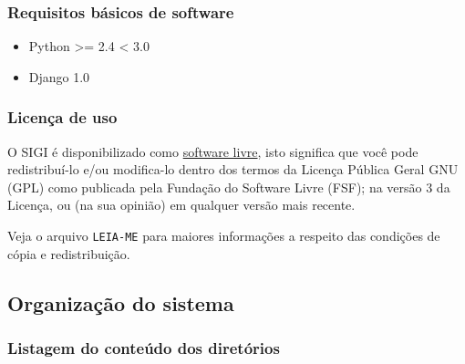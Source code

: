 
\hypertarget{requisitos-b-sicos-de-software}{}
\subsubsection*{Requisitos básicos de software}
\begin{itemize}
\item {} 
Python {\textgreater}= 2.4 {\textless} 3.0

\item {} 
Django 1.0

\end{itemize}



\hypertarget{licen-a-de-uso}{}
\subsubsection*{Licença de uso}

O SIGI é disponibilizado como
\href{http://pt.wikipedia.org/wiki/Software_Livre}{software livre},
isto significa que você pode redistribuí-lo e/ou modifica-lo dentro
dos termos da Licença Pública Geral GNU (GPL) como publicada pela
Fundação do Software Livre (FSF); na versão 3 da Licença, ou (na sua
opinião) em qualquer versão mais recente.

Veja o arquivo \texttt{LEIA-ME} para maiores informações a respeito das
condições de cópia e redistribuição.

\subsection{Organização do sistema}
\label{sec:org}

\subsubsection{Listagem do conteúdo dos diretórios}


